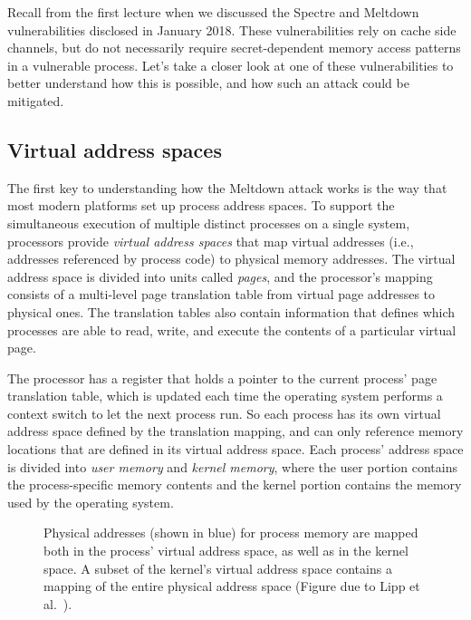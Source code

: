\documentclass[11pt,twoside]{scrartcl}
\begin{document}
Recall from the first lecture when we discussed the Spectre and Meltdown vulnerabilities disclosed in January 2018. These vulnerabilities rely on cache side channels, but do not necessarily require secret-dependent memory access patterns in a vulnerable process. Let's take a closer look at one of these vulnerabilities to better understand how this is possible, and how such an attack could be mitigated.

\subsection{Virtual address spaces}

The first key to understanding how the Meltdown attack works is the way that most modern platforms set up process address spaces. To support the simultaneous execution of multiple distinct processes on a single system, processors provide \emph{virtual address spaces} that map virtual addresses (i.e., addresses referenced by process code) to physical memory addresses. The virtual address space is divided into units called \emph{pages}, and the processor's mapping consists of a multi-level page translation table from virtual page addresses to physical ones. The translation tables also contain information that defines which processes are able to read, write, and execute the contents of a particular virtual page.

The processor has a register that holds a pointer to the current process' page translation table, which is updated each time the operating system performs a context switch to let the next process run. So each process has its own virtual address space defined by the translation mapping, and can only reference memory locations that are defined in its virtual address space. Each process' address space is divided into \emph{user memory} and \emph{kernel memory}, where the user portion contains the process-specific memory contents and the kernel portion contains the memory used by the operating system. 

\begin{figure}
\centering

\caption{Physical addresses (shown in blue) for process memory are mapped both in the process' virtual address space, as well as in the kernel space. A subset of the kernel's virtual address space contains a mapping of the entire physical address space (Figure due to Lipp et al.~\cite{Lipp18}).}
\end{figure}
\end{document}
